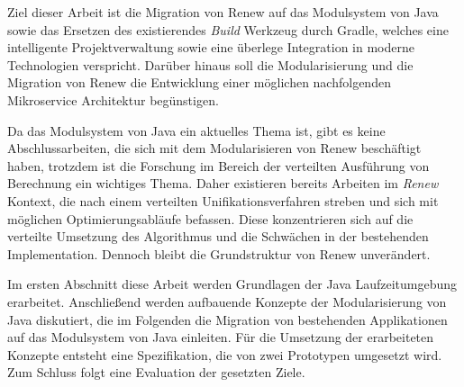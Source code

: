 Ziel dieser Arbeit ist die Migration von Renew auf das Modulsystem von Java sowie das Ersetzen des existierendes \textit{Build} Werkzeug durch Gradle, welches eine intelligente Projektverwaltung sowie eine überlege Integration in moderne Technologien verspricht. \newline
Darüber hinaus soll die Modularisierung und die Migration von Renew die Entwicklung einer möglichen nachfolgenden Mikroservice Architektur begünstigen.\bigbreak

Da das Modulsystem von Java ein aktuelles Thema ist, gibt es keine Abschlussarbeiten, die sich mit dem Modularisieren von Renew beschäftigt haben, trotzdem ist die Forschung im Bereich der verteilten Ausführung von Berechnung ein wichtiges Thema. Daher existieren bereits Arbeiten im \textit{Renew} Kontext, die nach einem verteilten Unifikationsverfahren streben und sich mit möglichen Optimierungsabläufe befassen.
Diese konzentrieren sich auf die verteilte Umsetzung des Algorithmus und die Schwächen in der bestehenden Implementation. Dennoch bleibt die Grundstruktur von Renew unverändert. \bigbreak

Im ersten Abschnitt diese Arbeit werden Grundlagen der Java Laufzeitumgebung erarbeitet. Anschließend werden aufbauende Konzepte der Modularisierung von Java diskutiert, die im Folgenden die Migration von bestehenden Applikationen auf das Modulsystem von Java einleiten. Für die Umsetzung der erarbeiteten Konzepte entsteht eine Spezifikation, die von zwei Prototypen umgesetzt wird. Zum Schluss folgt eine Evaluation der gesetzten Ziele.
\linespread{1.25}\selectfont

\tableofcontents %
\setcounter{lofdepth}{5}
\listoffigures
\blankpage





 
 

\blankpage
      
\begin{appendices}
\end{appendices}

\blankpage

